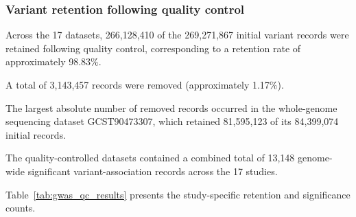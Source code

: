 \documentclass[11pt,a4paper]{article}
\begin{document}
\subsubsection{Variant retention following quality control}

Across the 17 datasets, 266,128,410 of the
269,271,867 initial variant records were retained
following quality control, corresponding to a
retention rate of approximately 98.83\%.

A total of 3,143,457 records were removed
(approximately 1.17\%).

The largest absolute number of removed records
occurred in the whole-genome sequencing dataset
GCST90473307, which retained 81,595,123 of its
84,399,074 initial records.

The quality-controlled datasets contained a combined
total of 13,148 genome-wide significant
variant-association records across the 17 studies.

Table~\ref{tab:gwas_qc_results} presents the
study-specific retention and significance counts.

\begingroup
\scriptsize
\setlength{\tabcolsep}{4pt}
\end{document}
